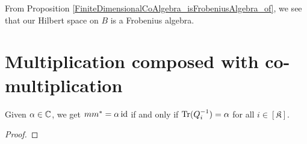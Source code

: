  From Proposition \ref{FiniteDimensionalCoAlgebra_isFrobeniusAlgebra_of}, we see that our Hilbert space on $B$ is a Frobenius algebra.

\section{Multiplication composed with co-multiplication}

 \begin{proposition}\label{delta_form_iff}
  Given $\alpha\in\mathbb{C}$, we get $mm^*=\alpha\operatorname{id}$ if and only if $\operatorname{Tr}(Q^{-1}_i)=\alpha$ for all $i\in[\mathfrak{K}]$.
 \end{proposition}
 \begin{proof}
 \end{proof}
